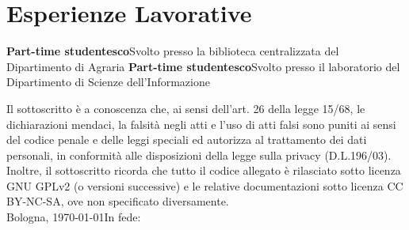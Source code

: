 \documentclass[11pt,a4paper]{moderncv}
\begin{document}
\section{Esperienze Lavorative}
 {\textbf{Part-time studentesco}\newline Svolto presso la biblioteca centralizzata del Dipartimento di Agraria}
 {\textbf{Part-time studentesco}\newline Svolto presso il laboratorio del Dipartimento di Scienze dell'Informazione}


    

\vspace{\fill}
{\footnotesize\noindent
Il sottoscritto è a conoscenza che, ai sensi dell'art. 26 della legge 15/68, le dichiarazioni mendaci, la falsità negli atti e l'uso di atti falsi sono puniti ai sensi del codice penale e delle leggi speciali ed autorizza al trattamento dei dati personali, in conformità alle disposizioni della legge sulla privacy (D.L.196/03). Inoltre, il sottoscritto ricorda che tutto il codice allegato è rilasciato sotto licenza GNU GPLv2 (o versioni successive) e le relative documentazioni sotto licenza CC BY-NC-SA, ove non specificato diversamente.}
\vspace*{0.8cm}\\
Bologna, \today\hfill In fede: 
\end{document}
